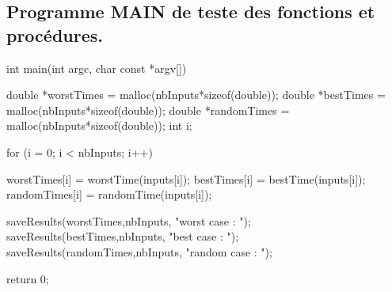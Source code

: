 \documentclass[12pt]{article}
\begin{document}
\subsection{Programme MAIN de teste des fonctions et procédures.}
\begin{sql}
int main(int argc, char const *argv[])
{
	double *worstTimes = malloc(nbInputs*sizeof(double));
	double *bestTimes = malloc(nbInputs*sizeof(double));
	double *randomTimes = malloc(nbInputs*sizeof(double));
	int i;

	for (i = 0; i < nbInputs; i++)
	{
		worstTimes[i] = worstTime(inputs[i]);
		bestTimes[i] = bestTime(inputs[i]);
		randomTimes[i] = randomTime(inputs[i]);

	}

	saveResults(worstTimes,nbInputs, "worst case : ");
	saveResults(bestTimes,nbInputs, "best case : ");
	saveResults(randomTimes,nbInputs, "random case : ");

	return 0;
}

\end{sql}
\end{document}
